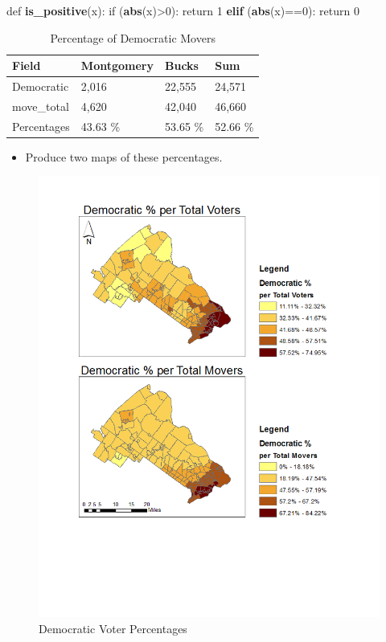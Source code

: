 \documentclass[]{article}
\newenvironment{Shaded}{\begin{snugshade}}{\end{snugshade}}
\newcommand{\KeywordTok}[1]{\textcolor[rgb]{0.13,0.29,0.53}{\textbf{{#1}}}}
\newcommand{\DecValTok}[1]{\textcolor[rgb]{0.00,0.00,0.81}{{#1}}}
\newcommand{\StringTok}[1]{\textcolor[rgb]{0.31,0.60,0.02}{{#1}}}
\newcommand{\NormalTok}[1]{{#1}}
\providecommand{\tightlist}{%
  \setlength{\itemsep}{0pt}\setlength{\parskip}{0pt}}
\begin{document}
\begin{Shaded}
\begin{Highlighting}[]
\NormalTok{def }\KeywordTok{is_positive}\NormalTok{(x):}
\StringTok{  }\NormalTok{if (}\KeywordTok{abs}\NormalTok{(x)>}\DecValTok{0}\NormalTok{):}
\StringTok{    }\NormalTok{return }\DecValTok{1}
  \KeywordTok{elif} \NormalTok{(}\KeywordTok{abs}\NormalTok{(x)==}\DecValTok{0}\NormalTok{):}
\StringTok{    }\NormalTok{return }\DecValTok{0} 
\end{Highlighting}
\end{Shaded}

\begin{table}[]
\centering
\caption{Percentage of Democratic Movers}
\label{my-label}
\begin{tabular}{llll}
Field       & Montgomery & Bucks    & Sum      \\
\hline
Democratic  & 2,016      & 22,555   & 24,571   \\
move\_total & 4,620      & 42,040   & 46,660   \\
Percentages & 43.63 \%   & 53.65 \% & 52.66 \%
\end{tabular}
\end{table}

\begin{itemize}
\tightlist
\item
  Produce two maps of these percentages.
\end{itemize}

\begin{figure}[htbp]
\centering
\includegraphics{question_1.png}
\caption{Democratic Voter Percentages}
\end{figure}
\end{document}
